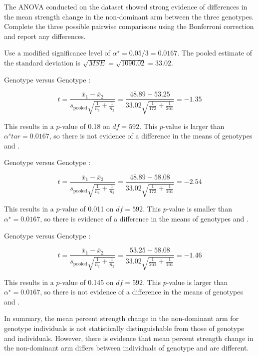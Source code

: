 \begin{example}{The ANOVA conducted on the  dataset showed strong evidence of differences in the mean strength change in the non-dominant arm between the three genotypes. Complete the three possible pairwise comparisons using the Bonferroni correction and report any differences.}

Use a modified significance level of $\alpha^\star = 0.05/3 = 0.0167$. The pooled estimate of the standard deviation is $\sqrt{MSE} = \sqrt{1090.02} = 33.02$.

Genotype  versus Genotype : 

\[
t = \frac{\overline{x}_1 - \overline{x}_2}{s_{\text{pooled}}\sqrt{\frac{1}{n_1} + \frac{1}{n_2}}} 
 = \dfrac{48.89 - 53.25}{33.02 \sqrt{\frac{1}{173} + \frac{1}{261}}} = -1.35\]
 
This results in a $p$-value of 0.18 on $df =592$. This $p$-value is larger than $\alpha^
star = 0.0167$, so there is not evidence of a difference in the means of genotypes  and .

Genotype  versus Genotype : 
 
 \[
 t = \frac{\overline{x}_1 - \overline{x}_2}{s_{\text{pooled}}\sqrt{\frac{1}{n_1} + \frac{1}{n_2}}}
 = \dfrac{48.89 - 58.08}{33.02 \sqrt{\frac{1}{173} + \frac{1}{161}}} = -2.54\]

This results in a $p$-value of 0.011 on $df =592$. This $p$-value is smaller than $\alpha^\star = 0.0167$, so there is evidence of a difference in the means of genotypes  and .
 
Genotype  versus Genotype :  
 
 \[
 t = \frac{\overline{x}_1 - \overline{x}_2}{s_{\text{pooled}}\sqrt{\frac{1}{n_1} + \frac{1}{n_2}}}
 = \dfrac{53.25 - 58.08}{33.02 \sqrt{\frac{1}{261} + \frac{1}{161}}} = -1.46\]

This results in a $p$-value of 0.145 on $df =592$. This $p$-value is larger than $\alpha^\star = 0.0167$, so there is not evidence of a difference in the means of genotypes  and .

In summary, the mean percent strength change in the non-dominant arm for genotype  individuals is not statistically distinguishable from those of genotype  and  individuals. However, there is evidence that mean percent strength change in the non-dominant arm differs between individuals of genotype  and  are different. 
	
\end{example}

